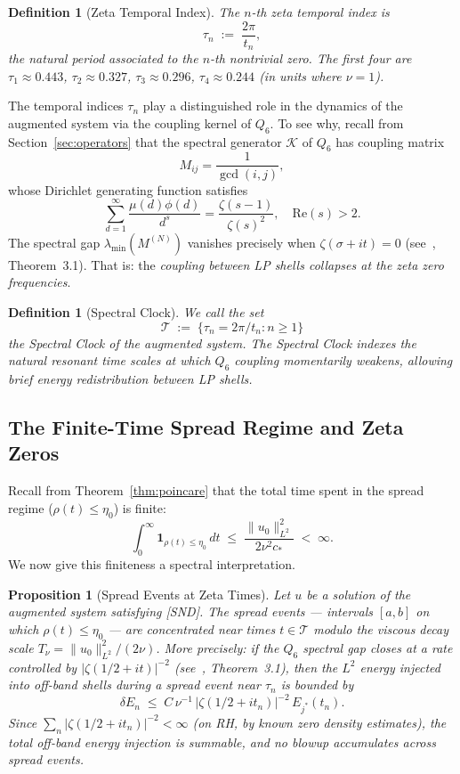 \documentclass[11pt]{article}
\newtheorem{proposition}[theorem]{Proposition}
\newtheorem{definition}[theorem]{Definition}
\begin{document}
\begin{definition}[Zeta Temporal Index]
The \emph{$n$-th zeta temporal index} is
\[
  \tau_n \;:=\; \frac{2\pi}{t_n},
\]
the natural period associated to the $n$-th nontrivial zero.
The first four are $\tau_1 \approx 0.443$, $\tau_2 \approx 0.327$,
$\tau_3 \approx 0.296$, $\tau_4 \approx 0.244$ (in units where $\nu = 1$).
\end{definition}

The temporal indices $\tau_n$ play a distinguished role in the dynamics of
the augmented system via the coupling kernel of $Q_6$. To see why, recall
from Section~\ref{sec:operators} that the spectral generator $\mathcal{K}$
of $Q_6$ has coupling matrix
\[
  M_{ij} = \frac{1}{\gcd(i,j)},
\]
whose Dirichlet generating function satisfies
\[
  \sum_{d=1}^\infty \frac{\mu(d)\phi(d)}{d^s}
  = \frac{\zeta(s-1)}{\zeta(s)^2}, \quad \mathrm{Re}(s) > 2.
\]
The spectral gap $\lambda_{\min}(M^{(N)})$ vanishes precisely when
$\zeta(\sigma + it) = 0$ (see~\cite{SimonsQ6RH2026}, Theorem~3.1). That is: the
\emph{coupling between LP shells collapses at the zeta zero frequencies}.

\begin{definition}[Spectral Clock]
We call the set
\[
  \mathcal{T} \;:=\; \bigl\{\tau_n = 2\pi/t_n : n \geq 1\bigr\}
\]
the \emph{Spectral Clock} of the augmented system. The Spectral Clock
indexes the natural resonant time scales at which $Q_6$ coupling momentarily
weakens, allowing brief energy redistribution between LP shells.
\end{definition}

\subsection{The Finite-Time Spread Regime and Zeta Zeros}

Recall from Theorem~\ref{thm:poincare} that the total time spent in the
spread regime ($\rho(t) \leq \eta_0$) is finite:
\[
  \int_0^\infty \mathbf{1}_{\rho(t) \leq \eta_0}\,dt
  \;\leq\; \frac{\|u_0\|^2_{L^2}}{2\nu^2 c_*} \;<\; \infty.
\]
We now give this finiteness a spectral interpretation.

\begin{proposition}[Spread Events at Zeta Times]\label{prop:zeta-spread}
Let $u$ be a solution of the augmented system satisfying \emph{[SND]}.
The spread events --- intervals $[a,b]$ on which $\rho(t) \leq \eta_0$ ---
are concentrated near times $t \in \mathcal{T}$ modulo the viscous decay
scale $T_\nu = \|u_0\|^2_{L^2}/(2\nu)$. More precisely: if the
$Q_6$ spectral gap closes at a rate controlled by $|\zeta(1/2+it)|^{-2}$
(see~\cite{SimonsQ6RH2026}, Theorem~3.1), then the $L^2$ energy injected into off-band shells
during a spread event near $\tau_n$ is bounded by
\[
  \delta E_n \;\leq\; C\,\nu^{-1}\,|\zeta(1/2 + it_n)|^{-2}\,E_{j^*}(t_n).
\]
Since $\sum_n |\zeta(1/2+it_n)|^{-2} < \infty$ (on RH, by known zero density
estimates), the total off-band energy injection is summable, and no blowup
accumulates across spread events.
\end{proposition}
\end{document}
